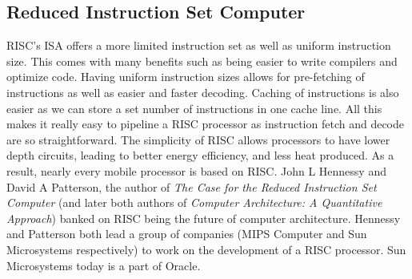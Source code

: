 \documentclass[10pt]{article}
\begin{document}
\subsection{Reduced Instruction Set Computer}
RISC's ISA offers a more limited instruction set as well as uniform instruction size. This comes with many benefits such as being easier to write compilers and optimize code. Having uniform instruction sizes allows for pre-fetching of instructions as well as easier and faster decoding. Caching of instructions is also easier as we can store a set number of instructions in one cache line. All this makes it really easy to pipeline a RISC processor as instruction fetch and decode are so straightforward. The simplicity of RISC allows processors to have lower depth circuits, leading to better energy efficiency, and less heat produced. As a result, nearly every mobile processor is based on RISC.
\newline
John L Hennessy and David A Patterson, the author of \textit{The Case for the Reduced Instruction Set Computer} (and later both authors of \textit{Computer Architecture: A Quantitative Approach}) banked on RISC being the future of computer architecture. Hennessy and Patterson both lead a group of companies (MIPS Computer and Sun Microsystems respectively) to work on the development of a RISC processor. Sun Microsystems today is a part of Oracle.\\
\end{document}
